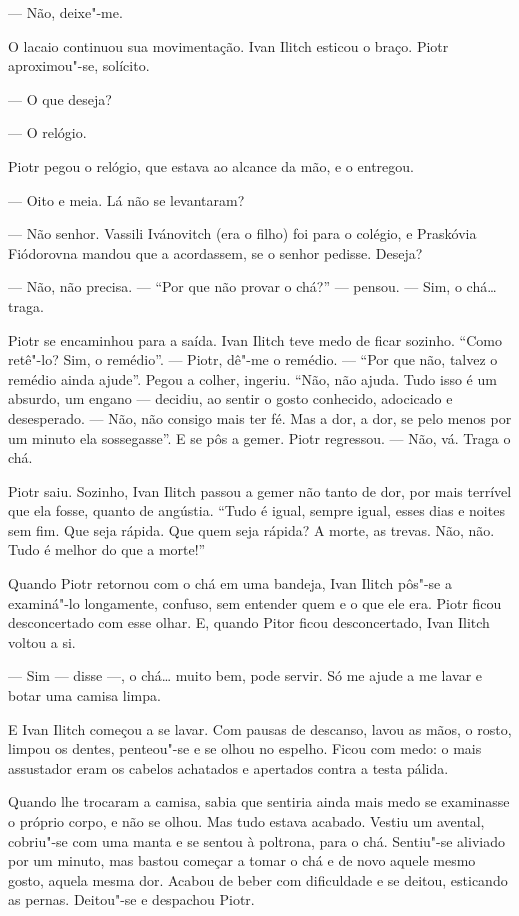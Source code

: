 --- Não, deixe"-me.

O lacaio continuou sua movimentação. Ivan Ilitch esticou o braço. Piotr
aproximou"-se, solícito.

--- O que deseja?

--- O relógio.

Piotr pegou o relógio, que estava ao alcance da mão, e o entregou.

--- Oito e meia. Lá não se levantaram?

--- Não senhor. Vassili Ivánovitch (era o filho) foi para o colégio, e
Praskóvia Fiódorovna mandou que a acordassem, se o senhor pedisse.
Deseja?

--- Não, não precisa. --- ``Por que não provar o chá?'' --- pensou. --- Sim, o
chá\ldots{} traga.

Piotr se encaminhou para a saída. Ivan Ilitch teve medo de ficar
sozinho. ``Como retê"-lo? Sim, o remédio''. --- Piotr, dê"-me o remédio. ---
``Por que não, talvez o remédio ainda ajude''. Pegou a colher, ingeriu.
``Não, não ajuda. Tudo isso é um absurdo, um engano --- decidiu, ao
sentir o gosto conhecido, adocicado e desesperado. --- Não, não consigo
mais ter fé. Mas a dor, a dor, se pelo menos por um minuto ela
sossegasse''. E se pôs a gemer. Piotr regressou. --- Não, vá. Traga o chá.

Piotr saiu. Sozinho, Ivan Ilitch passou a gemer não tanto de dor, por
mais terrível que ela fosse, quanto de angústia. ``Tudo é igual, sempre
igual, esses dias e noites sem fim. Que seja rápida. Que quem seja
rápida? A morte, as trevas. Não, não. Tudo é melhor do que a morte!''

Quando Piotr retornou com o chá em uma bandeja, Ivan Ilitch pôs"-se a
examiná"-lo longamente, confuso, sem entender quem e o que ele era. Piotr
ficou desconcertado com esse olhar. E, quando Pitor ficou desconcertado,
Ivan Ilitch voltou a si.

--- Sim --- disse ---, o chá\ldots{} muito bem, pode servir. Só me ajude a me
lavar e botar uma camisa limpa.

E Ivan Ilitch começou a se lavar. Com pausas de descanso, lavou as mãos,
o rosto, limpou os dentes, penteou"-se e se olhou no espelho. Ficou com
medo: o mais assustador eram os cabelos achatados e apertados contra a
testa pálida.

Quando lhe trocaram a camisa, sabia que sentiria ainda mais medo se
examinasse o próprio corpo, e não se olhou. Mas tudo estava acabado.
Vestiu um avental, cobriu"-se com uma manta e se sentou à poltrona, para
o chá. Sentiu"-se aliviado por um minuto, mas bastou começar a tomar o
chá e de novo aquele mesmo gosto, aquela mesma dor. Acabou de beber com
dificuldade e se deitou, esticando as pernas. Deitou"-se e despachou
Piotr.

